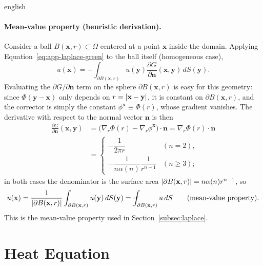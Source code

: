\begin{hyphenrules}{english}
\paragraph{Mean-value property (heuristic derivation).}
Consider a ball $B(\mathbf{x},r)\subset\Omega$ centered at a point $\mathbf{x}$ inside the domain. Applying
Equation~\eqref{eq:app-laplace-green} to the ball itself (homogeneous case),
\begin{equation}
  u(\mathbf{x})=-\int_{\partial B(\mathbf{x},r)}u(\mathbf{y})\frac{\partial G}{\partial\mathbf{n}}(\mathbf{x},\mathbf{y})\,d S(\mathbf{y}).
  \label{eq:mvp-1}
\end{equation}
Evaluating the $\partial G/\partial\mathbf{n}$ term on the sphere $\partial B(\mathbf{x},r)$ is easy for this geometry:
since $\Phi(\mathbf{y}-\mathbf{x})$ only depends on $r=\left\lvert \mathbf{x}-\mathbf{y} \right\rvert$, it is constant on $\partial B(\mathbf{x},r)$, and the
corrector is simply the constant $\phi^{\mathbf{x}}\equiv\Phi(r)$, whose gradient vanishes. The derivative with
respect to the normal vector $\mathbf{n}$ is then
\begin{align}
  \frac{\partial G}{\partial\mathbf{n}}(\mathbf{x},\mathbf{y})
    &=\big(\nabla_r\Phi(r)-\nabla_r\phi^{\mathbf{x}}\big)\cdot\mathbf{n}=\nabla_r\Phi(r)\cdot\mathbf{n} \label{eq:mvp-2}\\
    &=\begin{cases}
        -\dfrac{1}{2\pi r} & (n=2),\\[2mm]
        -\dfrac{1}{n\alpha(n)}\dfrac{1}{r^{n-1}} & (n\ge3);
      \end{cases} \label{eq:mvp-3}
\end{align}
in both cases the denominator is the surface area $\left\lvert \partial B(\mathbf{x},r) \right\rvert=n\alpha(n)r^{n-1}$, so
\begin{equation}
  u(\mathbf{x})=\frac{1}{\abs{\partial B(\mathbf{x},r)}}\int_{\partial B(\mathbf{x},r)}u(\mathbf{y})\,d S(\mathbf{y})
  =\fint_{\partial B(\mathbf{x},r)}u\,d S \qquad\text{(mean-value property)}.
  \label{eq:app-mvp}
\end{equation}
This is the mean-value property used in Section~\ref{subsec:laplace}.

\section{Heat Equation}\label{app-sec:heat}


\end{hyphenrules}
